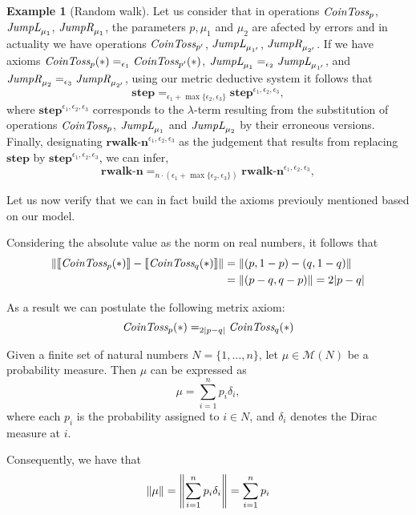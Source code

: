 \documentclass[10pt,a4paper]{amsart}
\theoremstyle{definition}
\theoremstyle{definition}
\newtheorem{example}[definition]{Example}
\theoremstyle{definition}
\theoremstyle{definition}
\theoremstyle{definition}
\theoremstyle{definition}
\begin{document}
\begin{example}[Random walk]
    Let us consider that in operations $\emph{CoinToss}_p$, $\emph{JumpL}_{\mu_1}$, $\emph{JumpR}_{\mu_1}$, the parameters $p, \mu_1$ and $\mu_2$ are afected by errors and in actuality we have operations $\emph{CoinToss}_{p'}$, $\emph{JumpL}_{\mu_{1'}}$, $\emph{JumpR}_{\mu_{2'}}$. 
    If we have axioms 
    $\emph{CoinToss}_p (*) =_{\epsilon_1}\emph{CoinToss}_{p'}(*)$, 
    $\emph{JumpL}_{\mu_1} =_{\epsilon_2}\emph{JumpL}_{\mu_{1'}}$, and $\emph{JumpR}_{\mu_2} =_{\epsilon_3}\emph{JumpR}_{\mu_{2'}}$, using our metric deductive system it follows that 
    $$\textbf{step} =_{\epsilon_1 + \max\{\epsilon_2, \epsilon_3\}} \textbf{step}^{\epsilon_1, \epsilon_2, \epsilon_3},$$
    where $\textbf{step}^{\epsilon_1, \epsilon_2, \epsilon_3}$ corresponds to the $\lambda$-term resulting from the substitution of operations $\emph{CoinToss}_p$, $\emph{JumpL}_{\mu_1}$ and $\emph{JumpL}_{\mu_2}$ by their erroneous versions. 
    Finally, designating $\textbf{rwalk-n}^{\epsilon_1, \epsilon_2, \epsilon_3}$ as the judgement that results from replacing $\textbf{step}$ by $\textbf{step}^{\epsilon_1, \epsilon_2, \epsilon_3}$, we can infer,
    $$\textbf{rwalk-n} =_{n \cdot (\epsilon_1 + \max\{\epsilon_2, \epsilon_3\})} \textbf{rwalk-n}^{\epsilon_1, \epsilon_2, \epsilon_3},$$

      


    Let us now verify that we can in fact build the axioms previouly mentioned based on our model.


   

  Considering the absolute value as the norm on real numbers, it follows that
  \begin{align*}
    \left\lVert \left \llbracket \emph{CoinToss}_p(*) \right \rrbracket - \left \llbracket \emph{CoinToss}_q(*) \right \rrbracket \right\rVert & = \left\lVert (p,1-p) - (q, 1-q) \right\rVert \\
    & =\left\lVert (p-q,q-p) \right\rVert  = 2|p-q|
  \end{align*}

  As a result we can postulate the following metrix axiom:
  $$ \emph{CoinToss}_p(*) =_{2|p-q|} \emph{CoinToss}_q(*)$$


  Given a finite set of natural numbers \(N = \{1, \ldots, n\}\), let \(\mu \in \mathcal{M}(N)\) be a probability measure. Then \(\mu\) can be expressed as
  \[
  \mu = \sum_{i=1}^{n} p_i \delta_i,
  \]
  where each \(p_i\) is the probability assigned to \(i \in N\), and \(\delta_i\) denotes the Dirac measure at \(i\).

    Consequently, we have that 
    $$ \left\lVert \mu \right\rVert =  \left\lVert \sum_{i=1}^{n} p_i \delta_i \right\rVert = \sum_{i=1}^{n} p_i$$


\end{example}
\end{document}
